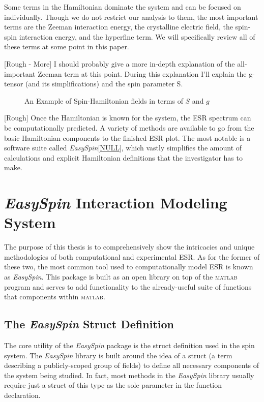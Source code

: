 \documentclass[oneside, astronomy, noacknowlegments]{BYUPhys}
\begin{document}
Some terms in the Hamiltonian dominate the system and can be focused on individually. Though we do not restrict our analysis to them, the most important terms are the Zeeman interaction energy, the crystalline electric field, the spin-spin interaction energy, and the hyperfine term. We will specifically review all of these terms at some point in this paper.

[Rough - More] I should probably give a more in-depth explanation of the all-important Zeeman term at this point. During this explanation I'll explain the g-tensor (and its simplifications) and the spin parameter S.

\begin{figure}
    \caption[Example of spin-hamiltonion fields]{\label{fig:HamFields}
     An Example of Spin-Hamiltonian fields in terms of $S$ and $g$}
 \end{figure}

[Rough] Once the Hamiltonian is known for the system, the ESR spectrum can be computationally predicted. A variety of methods are available to go from the basic Hamiltonian components to the finished ESR plot. The most notable is a software suite called \textit{EasySpin}\ref{NULL}, which vastly simplifies the amount of calculations and explicit Hamiltonian definitions that the investigator has to make.

\section{\textit{EasySpin} Interaction Modeling System}

The purpose of this thesis is to comprehensively show the intricacies and unique methodologies of both computational and experimental ESR. As for the former of these two, the most common tool used to computationally model ESR is known as \textit{EasySpin}. This package is built as an open library on top of the \textsc{matlab} program and serves to add functionality to the already-useful suite of functions that components within \textsc{matlab}.

\subsection{The \textit{EasySpin} Struct Definition}

The core utility of the \textit{EasySpin} package is the struct definition used in the spin system. The \textit{EasySpin} library is built around the idea of a struct (a term describing a publicly-scoped group of fields) to define all necessary components of the system being studied. In fact, most methods in the \textit{EasySpin} library usually require just a struct of this type as the sole parameter in the function declaration.
\end{document}
